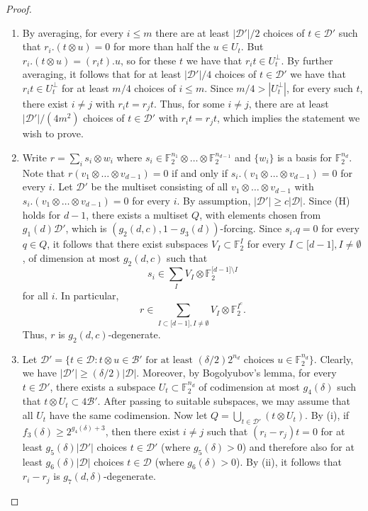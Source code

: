 \documentclass[11pt]{article}
\numberwithin{equation}{section}
\theoremstyle{definition}
\theoremstyle{plain}
\newcommand\F{\mathbb{F}}
\renewcommand\d{\delta}
\newcommand \cB{\mathcal B}
\newcommand \cD{\mathcal D}
\newcommand \s{\subset}
\begin{document}
\begin{proof}
	\begin{enumerate}[label=(\roman*)]
		\item By averaging, for every $i\leq m$ there are at least $|\cD'|/2$ choices of $t\in\cD'$ such that $r_i.(t\otimes u)=0$ for more than half the $u\in U_t$. But $r_i.(t\otimes u)=(r_it).u$, so for these $t$ we have that $r_it\in U_t^\perp$. By further averaging, it follows that for at least $|\cD'|/4$ choices of $t\in \cD'$ we have that $r_it\in U_t^{\perp}$ for at least $m/4$ choices of $i\leq m$. Since $m/4>|U_t^{\perp}|$, for every such $t$, there exist $i\neq j$ with $r_it=r_jt$. Thus, for some $i\neq j$, there are at least ${|\cD'|}/{(4m^2)}$ choices of $t\in \cD'$ with $r_it=r_jt$, which implies the statement we wish to prove.
		\item Write $r=\sum_{i} s_i\otimes w_i$ where $s_i\in \F_2^{n_1}\otimes \dots \otimes \F_2^{n_{d-1}}$ and $\{w_i\}$ is a basis for $\F_2^{n_d}$. Note that $r(v_1\otimes \dots \otimes v_{d-1})=0$ if and only if $s_i.(v_1\otimes \dots \otimes v_{d-1})=0$ for every $i$. Let $\cD'$ be the multiset consisting of all $v_1\otimes \dots \otimes v_{d-1}$ with $s_i.(v_1 \otimes \dots \otimes v_{d-1})=0$ for every $i$. By assumption, $|\cD'|\geq c|\cD|$. Since (H) holds for $d-1$, there exists a multiset $Q$, with elements chosen from $g_1(d)\cD'$, which is $(g_2(d,c),1-g_3(d))$-forcing. Since $s_i.q=0$ for every $q\in Q$, it follows that there exist subspaces $V_I\s \F_2^{I}$ for every $I\s \lbrack d-1\rbrack,I\neq \emptyset$, of dimension at most $g_2(d,c)$ such that
                  \[
                    s_i\in \sum_{I}V_I\otimes \F_2^{\lbrack d-1\rbrack \setminus I}
                  \]
                  for all $i$. In particular,
                  \[
                    r\in \sum_{I\s \lbrack d-1 \rbrack, I\neq
                      \emptyset} V_I\otimes \F_2^{I^c}.
                  \]
                  Thus, $r$ is $g_2(d,c)$-degenerate.
		\item Let $\cD'=\{t\in \cD: t\otimes u\in \cB' \text{ for at least } ({\d}/{2})2^{n_d} \text{ choices } u\in \F_2^{n_d}\}$. Clearly, we have $|\cD'|\geq ({\d}/{2})|\cD|$. Moreover, by Bogolyubov's lemma, for every $t\in \cD'$, there exists a subspace $U_t\s \F_2^{n_d}$ of codimension at most $g_4(\d)$ such that $t\otimes U_t\s 4\cB'$. After passing to suitable subspaces, we may assume that all $U_t$ have the same codimension. Now let $Q=\bigcup_{t\in \cD'}(t\otimes U_t)$. By (i), if $f_3(\d)\geq 2^{g_4(\d)+3}$, then there exist $i\neq j$ such that $(r_i-r_j)t=0$ for at least $g_5(\d)|\cD'|$ choices $t\in \cD'$ (where $g_5(\d)>0$) and therefore also for at least $g_6(\d)|\cD|$ choices $t\in \cD$ (where $g_6(\d)>0$). By (ii), it follows that $r_i-r_j$ is $g_7(d,\d)$-degenerate.

\end{enumerate}
\end{proof}
\end{document}
